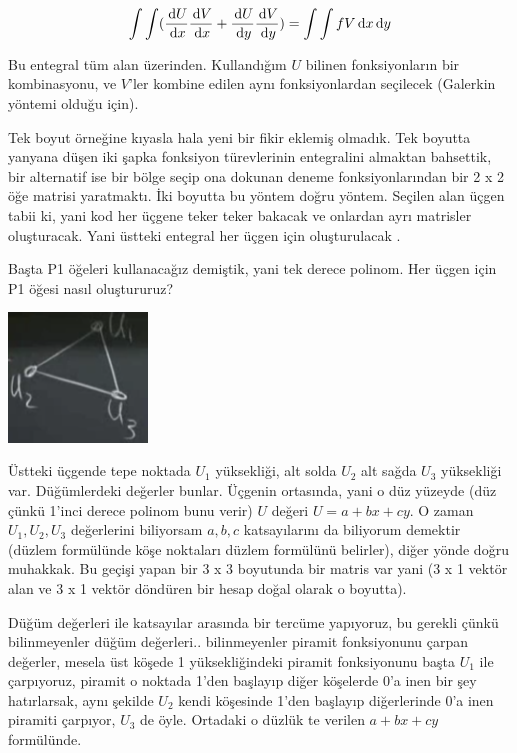 \documentclass[12pt,fleqn]{article}\usepackage{../../common}
\begin{document}
$$
\int \int
(
\frac{\,\mathrm{d} U}{\,\mathrm{d} x} \frac{\,\mathrm{d} V}{\,\mathrm{d} x} +
\frac{\,\mathrm{d} U}{\,\mathrm{d} y} \frac{\,\mathrm{d} V}{\,\mathrm{d} y} 
) =
\int \int f V  \,\mathrm{d} x \,\mathrm{d} y
$$

Bu entegral tüm alan üzerinden. Kullandığım $U$ bilinen fonksiyonların bir
kombinasyonu, ve $V$'ler kombine edilen aynı fonksiyonlardan seçilecek (Galerkin
yöntemi olduğu için). 

Tek boyut örneğine kıyasla hala yeni bir fikir eklemiş olmadık. Tek boyutta
yanyana düşen iki şapka fonksiyon türevlerinin entegralini almaktan bahsettik,
bir alternatif ise bir bölge seçip ona dokunan deneme fonksiyonlarından bir 2 x
2 öğe matrisi yaratmaktı. İki boyutta bu yöntem doğru yöntem. Seçilen alan üçgen
tabii ki, yani kod her üçgene teker teker bakacak ve onlardan ayrı matrisler
oluşturacak. Yani üstteki entegral her üçgen için oluşturulacak .

Başta P1 öğeleri kullanacağız demiştik, yani tek derece polinom. Her üçgen
için P1 öğesi nasıl oluştururuz? 

\includegraphics[width=10em]{compscieng_1_27_04.png}

Üstteki üçgende tepe noktada $U_1$ yüksekliği, alt solda $U_2$ alt sağda $U_3$
yüksekliği var. Düğümlerdeki değerler bunlar. Üçgenin ortasında, yani o düz
yüzeyde (düz çünkü 1'inci derece polinom bunu verir) $U$ değeri $U = a+bx+cy$.
O zaman $U_1,U_2,U_3$ değerlerini biliyorsam $a,b,c$ katsayılarını da biliyorum
demektir (düzlem formülünde köşe noktaları düzlem formülünü belirler), diğer
yönde doğru muhakkak. Bu geçişi yapan bir 3 x 3 boyutunda bir matris var yani (3
x 1 vektör alan ve 3 x 1 vektör döndüren bir hesap doğal olarak o boyutta).

Düğüm değerleri ile katsayılar arasında bir tercüme yapıyoruz, bu gerekli çünkü
bilinmeyenler düğüm değerleri.. bilinmeyenler piramit fonksiyonunu çarpan
değerler, mesela üst köşede 1 yüksekliğindeki piramit fonksiyonunu başta $U_1$
ile çarpıyoruz, piramit o noktada 1'den başlayıp diğer köşelerde 0'a inen bir
şey hatırlarsak, aynı şekilde $U_2$ kendi köşesinde 1'den başlayıp diğerlerinde
0'a inen piramiti çarpıyor, $U_3$ de öyle. Ortadaki o düzlük te verilen
$a + bx + cy$ formülünde.
\end{document}
